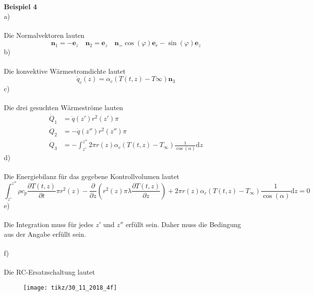 \textbf{Beispiel 4}\\
a)\\ \\
Die Normalvektoren lauten
\[
	\textbf{n}_1 = -\textbf{e}_z \quad \textbf{n}_2 = \textbf{e}_z \quad \textbf{n}_ = \cos(\varphi)\textbf{e}_r -\sin(\varphi)\textbf{e}_z
\]
b) \\ \\
Die konvektive Wärmestromdichte lautet
\[
	\dot{q}_c(z) = \alpha_c(T(t,z) - T\infty)\textbf{n}_3
\]
\newpage
\noindent
c) \\ \\
Die drei gesuchten Wärmeströme lauten
\begin{align*}
	\dot{Q}_1 &= \dot{q}(z')r^2(z')\pi \\
	\dot{Q}_2 &= -\dot{q}(z'')r^2(z'')\pi \\
	\dot{Q}_3 &= -\int_{z'}^{z''}2\pi r(z)\alpha_c(T(t,z) - T_\infty)\frac{1}{\cos(\alpha)}\text{d}z
\end{align*}
d)\\ \\
Die Energiebilanz für das gegebene Kontrollvolumen lautet
\[
	\int_{z'}^{z''}\rho c_p\frac{\partial T(t,z)}{\partial t}\pi r^2(z) - \frac{\partial}{\partial z}(r^2(z)\pi\lambda\frac{\partial T(t,z)}{\partial z}) + 2\pi r(z)\alpha_c(T(t,z) - T_\infty)\frac{1}{\cos(\alpha)}\text{d}z = 0
\]
e)\\ \\
Die Integration muss für jedes $z'$ und $z''$ erfüllt sein. Daher muss die Bedingung aus der Angabe erfüllt sein.\\ \\
f)\\ \\
Die RC-Ersatzschaltung lautet
\begin{figure}[h]
	\centering
	\texttt{[image: tikz/30\_11\_2018\_4f]}
\end{figure}